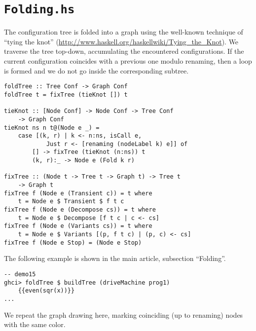 \section{\texttt{Folding.hs}}

The configuration tree is folded into a graph using the 
well-known technique of ``tying the knot''
(\url{http://www.haskell.org/haskellwiki/Tying_the_Knot}).
We traverse the tree top-down, accumulating the encountered configurations.
If the current configuration coincides with a previous one modulo renaming,
then a loop is formed and we do not go inside the corresponding subtree.

\begin{lstlisting}[name=folding]
foldTree :: Tree Conf -> Graph Conf
foldTree t = fixTree (tieKnot []) t

tieKnot :: [Node Conf] -> Node Conf -> Tree Conf 
	-> Graph Conf
tieKnot ns n t@(Node e _) =
	case [(k, r) | k <- n:ns, isCall e, 
			Just r <- [renaming (nodeLabel k) e]] of
		[] -> fixTree (tieKnot (n:ns)) t
		(k, r):_ -> Node e (Fold k r)

fixTree :: (Node t -> Tree t -> Graph t) -> Tree t 
	-> Graph t
fixTree f (Node e (Transient c)) = t where
	t = Node e $ Transient $ f t c
fixTree f (Node e (Decompose cs)) = t where
	t = Node e $ Decompose [f t c | c <- cs]
fixTree f (Node e (Variants cs)) = t where
	t = Node e $ Variants [(p, f t c) | (p, c) <- cs]
fixTree f (Node e Stop) = (Node e Stop)
\end{lstlisting}

The following example is shown in the main article, subsection ``Folding''.
\begin{lstlisting}[style=demo]
-- demo15
ghci> foldTree $ buildTree (driveMachine prog1) 
	{{even(sqr(x))}}
...

\end{lstlisting}

We repeat the graph drawing here, marking coinciding (up to renaming) nodes
with the same color.

\begin{landscape}

\end{landscape}
